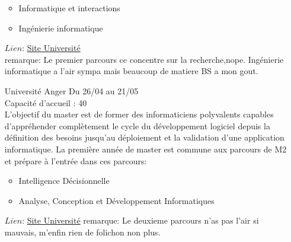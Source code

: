 \documentclass[a4paper,11pt]{article}
\begin{document}
\begin{enumerate}
\begin{itemize}
                    \item Informatique et interactions
                    \item Ingénierie informatique
                \end{itemize}
                $Lien$: \href{https://univ-cotedazur.fr/offre-de-formation/master-informatique-1}{Site Université}
                \\remarque: Le premier parcours ce concentre sur la recherche,nope. Ingénierie informatique a l'air sympa mais beaucoup de matiere BS a mon gout.
\\
        \item [\color{LightOrangeHaf}Université Anger] Du 26/04 au 21/05
                \\Capacité d'accueil : 40
                \\L’objectif du master est de former des informaticiens polyvalents capables d’appréhender complètement le cycle du développement logiciel depuis la définition des besoins jusqu’au déploiement et la validation d’une application informatique. La première année de master est commune aux parcours de M2 et prépare à l'entrée dans ces parcours:
                \begin{itemize}
                    \item Intelligence Décisionnelle
                    \item Analyse, Conception et Développement Informatiques
                \end{itemize}
                $Lien$: \href{http://www.info.univ-angers.fr/dptinfo/}{Site Université}
                remarque: Le deuxieme parcours n'as pas l'air si mauvais, m'enfin rien de folichon non plus.



    \end{enumerate}
\end{document}
